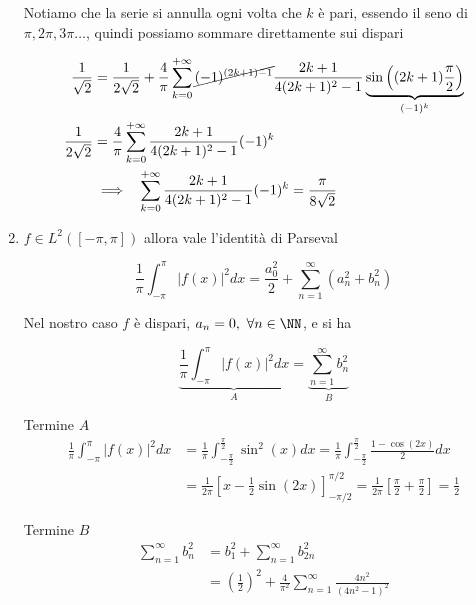 \begin{enumerate}
Notiamo che la serie si annulla ogni volta che $k$ è pari, essendo il seno di $\pi, 2\pi, 3\pi \dotsc $, quindi possiamo sommare direttamente sui dispari

\begin{equation*}
\begin{aligned}
\frac{1}{\sqrt{2}} & = \frac{1}{2\sqrt{2}} + \frac{4}{\pi}\sum^{+ \infty}_{k = 0}\cancel{(- 1)^{(2k + 1) - 1}}\frac{2k + 1}{4(2k + 1)^{2} - 1}\underbrace{\sin\left((2k + 1)\frac{\pi}{2}\right)}_{(- 1)^{k}}\\
\frac{1}{2\sqrt{2}} & = \frac{4}{\pi}\sum^{+ \infty}_{k = 0}\frac{2k + 1}{4(2k + 1)^{2} - 1}(- 1)^{k}\\
 & \implies \ \ \sum^{+ \infty}_{k = 0}\frac{2k + 1}{4(2k + 1)^{2} - 1}(- 1)^{k} = \frac{\pi}{8\sqrt{2}}
\end{aligned}
\end{equation*}
\item $f\in L^{2}([ - \pi, \pi ])$ allora vale l'identità di Parseval

\begin{equation*}
\frac{1}{\pi}\int^{\pi}_{- \pi}| f(x)|^{2} dx = \frac{a^{2}_{0}}{2} + \sum\limits^{\infty}_{n = 1}\left(a^{2}_{n} + b^{2}_{n}\right)
\end{equation*}

Nel nostro caso $f$ è dispari, $a_{n} = 0, \ \forall n\in \NN $, e si ha

\begin{equation*}
\underbrace{\frac{1}{\pi}\int^{\pi}_{- \pi}| f(x)|^{2} dx}_{A} = \underbrace{\sum\limits^{\infty}_{n = 1} b^{2}_{n}}_{B}
\end{equation*}

Termine $A$
\begin{equation*}
\begin{aligned}
\frac{1}{\pi}\int^{\pi}_{- \pi}| f(x)|^{2} dx & = \frac{1}{\pi}\int^{\frac{\pi}{2}}_{- \frac{\pi}{2}}\sin^{2}(x) dx = \frac{1}{\pi}\int^{\frac{\pi}{2}}_{- \frac{\pi}{2}}\frac{1 - \cos(2x)}{2} dx\\
 & = \frac{1}{2\pi}\left[ x - \frac{1}{2}\sin(2x)\right]^{\pi /2}_{- \pi /2} = \frac{1}{2\pi}\left[\frac{\pi}{2} + \frac{\pi}{2}\right] = \frac{1}{2}
\end{aligned}
\end{equation*}

Termine $B$
\begin{equation*}
\begin{aligned}
\sum\limits^{\infty}_{n = 1} b^{2}_{n} & = b^{2}_{1} + \sum\limits^{\infty}_{n = 1} b^{2}_{2n}\\
 & = \left(\frac{1}{2}\right)^{2} + \frac{4}{\pi^{2}}\sum\limits^{\infty}_{n = 1}\frac{4n^{2}}{\left(4n^{2} - 1\right)^{2}}
\end{aligned}
\end{equation*}


\end{enumerate}
